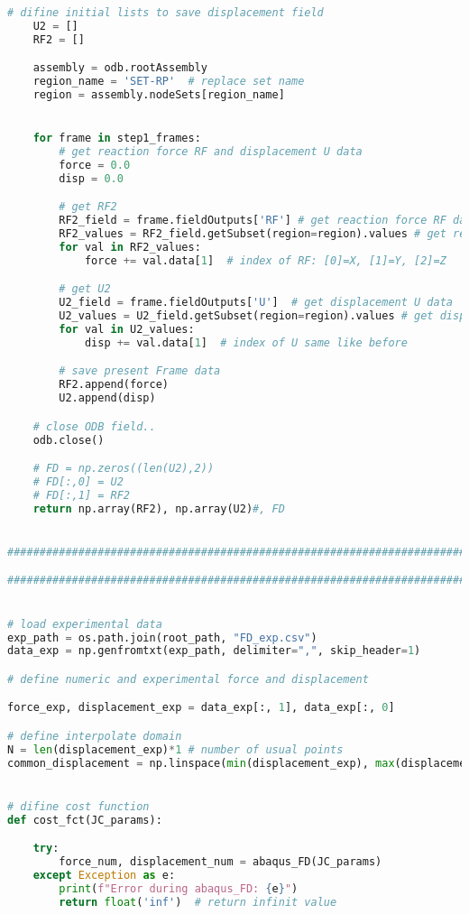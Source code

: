 \documentclass[12pt,a4paper]{article}
\begin{document}
\begin{lstlisting}[language=Python, caption={Optimisation force-déplacement}]
    # difine initial lists to save displacement field
    U2 = []
    RF2 = []

    assembly = odb.rootAssembly
    region_name = 'SET-RP'  # replace set name
    region = assembly.nodeSets[region_name]


    for frame in step1_frames:
        # get reaction force RF and displacement U data
        force = 0.0
        disp = 0.0

        # get RF2
        RF2_field = frame.fieldOutputs['RF'] # get reaction force RF data
        RF2_values = RF2_field.getSubset(region=region).values # get reaction force RF values
        for val in RF2_values:
            force += val.data[1]  # index of RF: [0]=X, [1]=Y, [2]=Z

        # get U2
        U2_field = frame.fieldOutputs['U']  # get displacement U data
        U2_values = U2_field.getSubset(region=region).values # get displacement U values
        for val in U2_values:
            disp += val.data[1]  # index of U same like before

        # save present Frame data
        RF2.append(force)
        U2.append(disp)

    # close ODB field..
    odb.close()

    # FD = np.zeros((len(U2),2))
    # FD[:,0] = U2
    # FD[:,1] = RF2
    return np.array(RF2), np.array(U2)#, FD


###############################################################################################

###############################################################################################


# load experimental data
exp_path = os.path.join(root_path, "FD_exp.csv")
data_exp = np.genfromtxt(exp_path, delimiter=",", skip_header=1) 

# define numeric and experimental force and displacement

force_exp, displacement_exp = data_exp[:, 1], data_exp[:, 0] 

# define interpolate domain 
N = len(displacement_exp)*1 # number of usual points
common_displacement = np.linspace(min(displacement_exp), max(displacement_exp), N)


# difine cost function
def cost_fct(JC_params):

    try:
        force_num, displacement_num = abaqus_FD(JC_params)
    except Exception as e:
        print(f"Error during abaqus_FD: {e}")
        return float('inf')  # return infinit value


\end{lstlisting}
\end{document}
